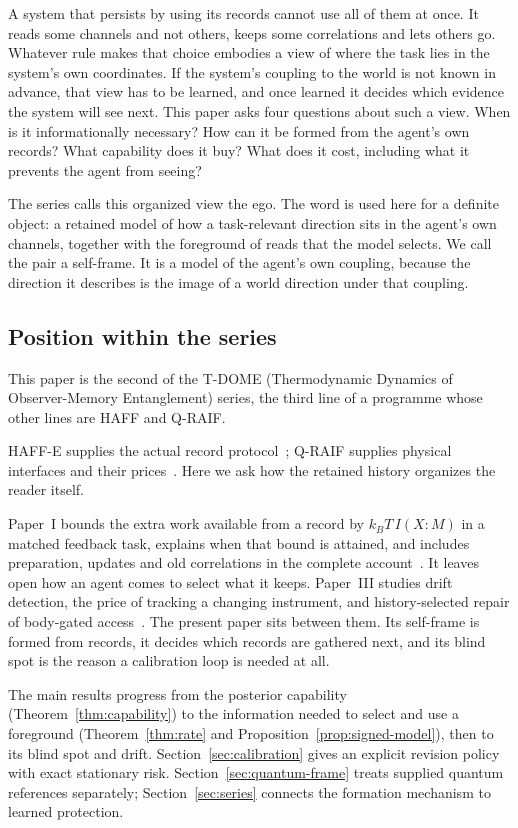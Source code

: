 \documentclass[12pt]{article}
\theoremstyle{definition}
\begin{document}
A system that persists by using its records cannot use all of them at once. It reads some channels and not others, keeps some correlations and lets others go. Whatever rule makes that choice embodies a view of where the task lies in the system's own coordinates. If the system's coupling to the world is not known in advance, that view has to be learned, and once learned it decides which evidence the system will see next. This paper asks four questions about such a view. When is it informationally necessary? How can it be formed from the agent's own records? What capability does it buy? What does it cost, including what it prevents the agent from seeing?

The series calls this organized view the ego. The word is used here for a definite object: a retained model of how a task-relevant direction sits in the agent's own channels, together with the foreground of reads that the model selects. We call the pair a self-frame. It is a model of the agent's own coupling, because the direction it describes is the image of a world direction under that coupling.

\subsection{Position within the series}

This paper is the second of the T-DOME (Thermodynamic Dynamics of Observer-Memory Entanglement) series, the third line of a programme whose other lines are HAFF and Q-RAIF.

HAFF-E supplies the actual record protocol~\cite{Liu2026HAFF_E};
Q-RAIF supplies physical interfaces and their prices~\cite{Liu2026QRAIF_B}.
Here we ask how the retained history organizes the reader itself.

Paper~I bounds the extra work available from a record by $k_BT\,I(X{:}M)$ in a matched feedback task, explains when that bound is attained, and includes preparation, updates and old correlations in the complete account~\cite{Liu2026TDOME_I}. It leaves open how an agent comes to select what it keeps. Paper~III studies drift detection, the price of tracking a changing instrument, and history-selected repair of body-gated access~\cite{Liu2026TDOME_III}. The present paper sits between them. Its self-frame is formed from records, it decides which records are gathered next, and its blind spot is the reason a calibration loop is needed at all.

The main results progress from the posterior capability
(Theorem~\ref{thm:capability}) to the information needed to select and
use a foreground (Theorem~\ref{thm:rate} and
Proposition~\ref{prop:signed-model}), then to its blind spot and drift.
Section~\ref{sec:calibration} gives an explicit revision policy with
exact stationary risk. Section~\ref{sec:quantum-frame} treats supplied
quantum references separately; Section~\ref{sec:series} connects the
formation mechanism to learned protection.
\end{document}
